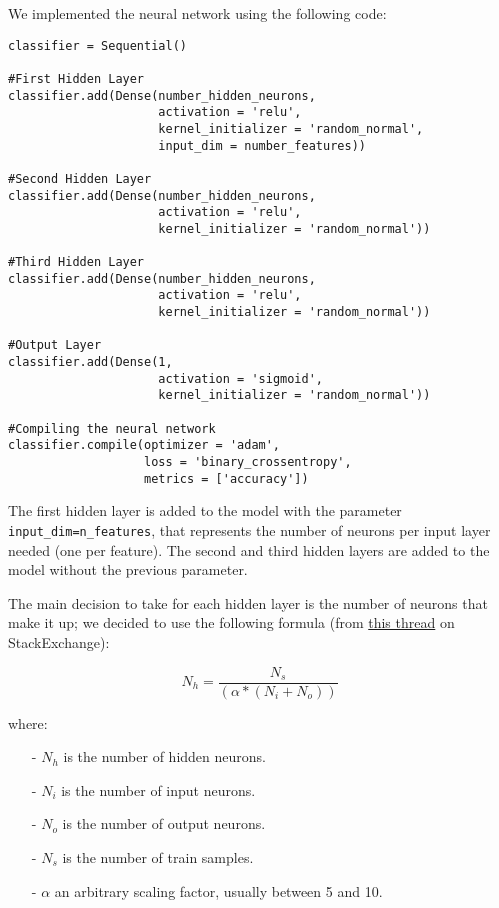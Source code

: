 We implemented the neural network using the following code:

\begin{lstlisting}[caption={Neural Network model},label={lst:nn-model}]
classifier = Sequential()

#First Hidden Layer
classifier.add(Dense(number_hidden_neurons, 
                     activation = 'relu', 
                     kernel_initializer = 'random_normal', 
                     input_dim = number_features))

#Second Hidden Layer
classifier.add(Dense(number_hidden_neurons, 
                     activation = 'relu', 
                     kernel_initializer = 'random_normal'))

#Third Hidden Layer
classifier.add(Dense(number_hidden_neurons, 
                     activation = 'relu', 
                     kernel_initializer = 'random_normal'))

#Output Layer
classifier.add(Dense(1, 
                     activation = 'sigmoid', 
                     kernel_initializer = 'random_normal'))

#Compiling the neural network
classifier.compile(optimizer = 'adam', 
                   loss = 'binary_crossentropy', 
                   metrics = ['accuracy'])
\end{lstlisting}

The first hidden layer is added to the model with the parameter \texttt{input\_dim=n\_features}, that represents the number of neurons per input layer needed (one per feature). The second and third hidden layers are added to the model without the previous parameter.

The main decision to take for each hidden layer is the number of neurons that make it up; we decided to use the following formula (from \href{https://stats.stackexchange.com/questions/181/how-to-choose-the-number-of-hidden-layers-and-nodes-in-a-feedforward-neural-netw}{this thread} on StackExchange):

\begin{equation}
N_h = \frac{N_s}{(\alpha * (N_i + N_o))}
\end{equation}

where:
\begin{itemize}
	
	\item[-] $N_h$ is the number of hidden neurons.
	
	\item[-] $N_i$ is the number of input neurons.
	
	\item[-] $N_o$ is the number of output neurons.
	
	\item[-] $N_s$ is the number of train samples.
	
	\item[-] $\alpha$ an arbitrary scaling factor, usually between 5 and 10.  
	
\end{itemize}

